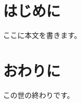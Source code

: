 \documentclass[12pt]{japanese_thesis}
\begin{document}
    
    \Maketitle %
    \tableofcontents
    \clearpage
    \chapter{はじめに}
    ここに本文を書きます。
    \chapter{おわりに}
    この世の終わりです。
    \nocite{*}
    \printbibliography[title=参考文献]
\end{document}
